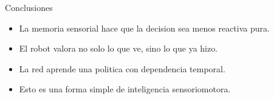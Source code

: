 \documentclass[aspectratio=169,11pt]{beamer}
\begin{document}
\begin{frame}{Conclusiones}
  \begin{itemize}
    \item La memoria sensorial hace que la decision sea menos reactiva pura.
    \item El robot valora no solo lo que ve, sino lo que ya hizo.
    \item La red aprende una politica con dependencia temporal.
    \item Esto es una forma simple de inteligencia sensoriomotora.
  \end{itemize}
\end{frame}
\end{document}
